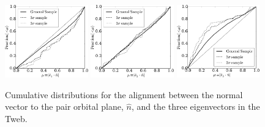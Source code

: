 \documentclass{emulateapj}
\begin{document}
\begin{figure}
\begin{center}
  \includegraphics[width=0.32\textwidth]{fig3a.pdf}
  \includegraphics[width=0.32\textwidth]{fig3b.pdf}
  \includegraphics[width=0.32\textwidth]{fig3c.pdf}
\end{center}
\caption{Cumulative distributions for the alignment between the normal
  vector to the pair orbital plane, $\hat{n}$, and the three eigenvectors in
  the Tweb.
    \label{fig:alignment_n}}  
\end{figure}
\end{document}
